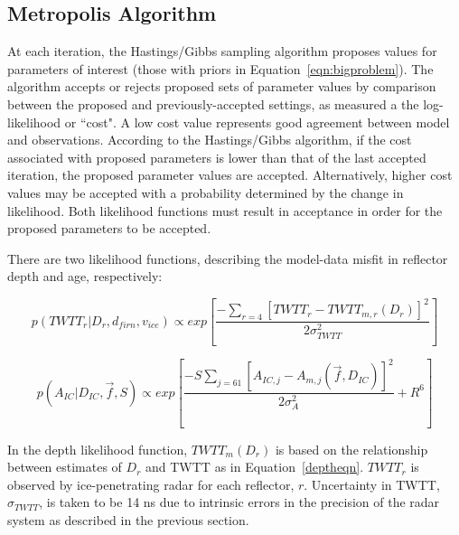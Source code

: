 \subsection{Metropolis Algorithm}\label{metrop}
At each iteration, the Hastings/Gibbs sampling algorithm \citep{hastings1970,gelfand1992} proposes values for parameters of interest (those with priors in Equation~\ref{eqn:bigproblem}). The algorithm accepts or rejects proposed sets of parameter values by comparison between the proposed and previously-accepted settings, as measured a the log-likelihood or ``cost". A low cost value represents good agreement between model and observations. According to the Hastings/Gibbs algorithm, if the cost associated with proposed parameters is lower than that of the last accepted iteration, the proposed parameter values are accepted. Alternatively, higher cost values may be accepted with a probability determined by the change in likelihood. Both likelihood functions must result in acceptance in order for the proposed parameters to be accepted.


There are two likelihood functions, describing the model-data misfit in reflector depth and age, respectively:

\begin{equation}\label{eqn:loglikedepth}
p(TWTT_r | D_r,d_{firn},v_{ice} ) \propto exp[\frac{-\sum_{r=4}[TWTT_{r} - TWTT_{m,r}(D_r)]^2}{2\sigma_{TWTT}^2}]
\end{equation}

\begin{equation}\label{eqn:loglikeage}
p(A_{IC} | D_{IC},\vec{f},S) \propto exp[\frac{-S\sum_{j = 61}[A_{IC,j} - A_{m,j}(\vec{f},D_{IC})]^2}{2\sigma_A^2} + R^6]
\end{equation}


In the depth likelihood function, $TWTT_m(D_r)$ is based on the relationship between estimates of $D_r$ and TWTT as in Equation~\ref{deptheqn}. $TWTT_r$ is observed by ice-penetrating radar for each reflector, $r$. Uncertainty in TWTT, $\sigma_{TWTT}$, is taken to be 14 ns due to intrinsic errors in the precision of the radar system as described in the previous section.



